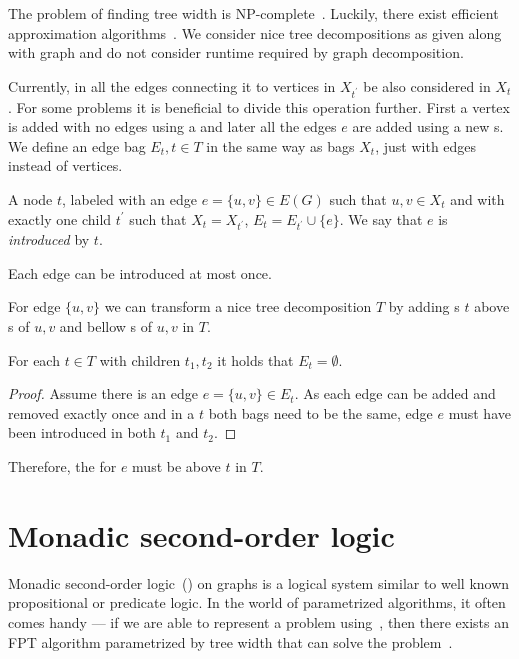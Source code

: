 The problem of finding tree width is NP-complete~\cite{tree_width_np_complete}.
Luckily, there exist efficient approximation algorithms~\cite{tree_width_approximation}.
We consider nice tree decompositions as given along with graph
and do not consider runtime required by graph decomposition.

Currently, in \IntroduceVertexNode{} all the edges connecting it
to vertices in \( X_{t^\prime} \) be also considered in \( X_t \).
For some problems it is beneficial to divide this operation further.
First a vertex is added with no edges using a \IntroduceVertexNode{}
and later all the edges \( e \) are added using a new \IntroduceEdgeNode{}s.
We define an edge bag \( E_t, t \in T \) in the same way as bags \( X_t \),
just with edges instead of vertices.
%
\begin{definition}
	A node \( t \), labeled with an edge \( e = \{u, v\} \in E(G) \)
	such that \( u, v \in X_t \) and with exactly one child \( t^\prime \)
	such that \( X_t = X_{t^\prime} \), \( E_t = E_{t^\prime} \cup \{e\} \).
	We say that \( e \) is \emph{introduced} by \( t \).
\end{definition}
%
Each edge can be introduced at most once.

For edge \( \{u, v\} \) we can transform a nice tree decomposition \( T \)
by adding \IntroduceEdgeNode{}s \( t \) above \IntroduceVertexNode{}s of \( u, v \)
and bellow \ForgetVertexNode{}s of \( u, v \) in \( T \).

%
\begin{lemma}
	For each \JoinNode{} \( t \in T \) with children \( t_1, t_2 \)
	it holds that \( E_t = \emptyset \).
\end{lemma}
%
\begin{proof}
	Assume there is an edge \( e = \{u, v\} \in E_t \).
	As each edge can be added and removed exactly once
	and in a \JoinNode{} \( t \) both bags need to be the same,
	edge \( e \) must have been introduced in both \( t_1 \) and \( t_2 \).
\end{proof}
%
Therefore, the \IntroduceEdgeNode{} for \( e \) must be above \( t \) in \( T \).

\section{Monadic second-order logic}

Monadic second-order logic~(\MSO{}) on graphs is a logical system similar to
well known propositional or predicate logic.
In the world of parametrized algorithms,
it often comes handy --- if we are able to represent a problem using~\MSO{},
then there exists an FPT algorithm parametrized by tree width
that can solve the problem~\cite{tree_width_mso}.

